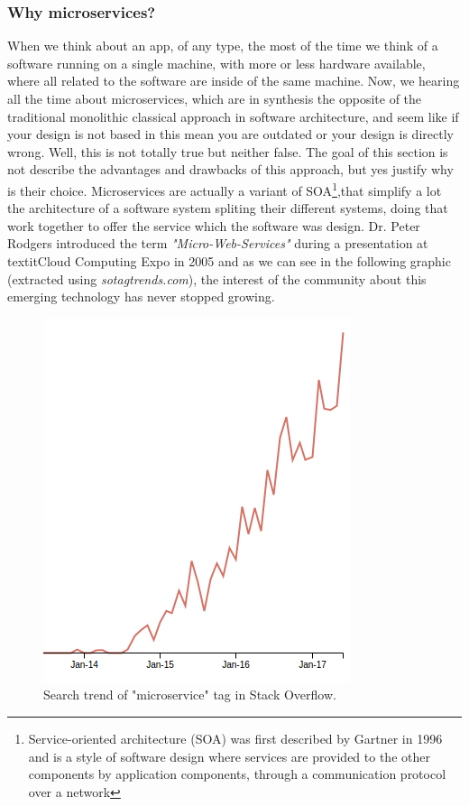 \subsubsection{Why microservices?}

When we think about an app, of any type, the most of the time we think of a software
running on a single machine, with more or less hardware available, where all
related to the software are inside of the same machine.
\intro
Now, we hearing all the time about microservices, which are in synthesis the
opposite of the traditional monolithic classical approach in software architecture,
and seem like if your design is not based in this mean you are outdated or your design is directly wrong.
Well, this is not totally true but neither false. The goal of this section is
not describe the advantages and drawbacks of this approach, but yes justify why
is their choice.
\intro
Microservices are actually a variant of SOA\footnote{Service-oriented architecture (SOA)
was first described by Gartner in 1996 and is a style of software design where
services are provided to the other components by application components, through
a communication protocol over a network},that simplify a lot the architecture
of a software system spliting their different systems, doing that work together
to offer the service which the software was design.
Dr. Peter Rodgers introduced the term \textit{"Micro-Web-Services"} during a presentation
at textit{Cloud Computing Expo} in 2005 and as we can see in the following graphic (extracted
using \textit{sotagtrends.com}), the interest of the community about this emerging technology
has never stopped growing.

\begin{figure}[H]
  \includegraphics[scale=0.5]{img/graphics/microservices_trend.png}
  \centering
  \caption{Search trend of "microservice" tag in Stack Overflow.}
\end{figure}

